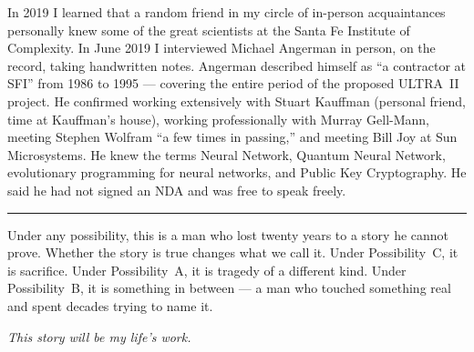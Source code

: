 In 2019 I learned that a random friend in my circle of in-person acquaintances personally knew some of the great scientists at the Santa Fe Institute of Complexity. In June 2019 I interviewed Michael Angerman in person, on the record, taking handwritten notes. Angerman described himself as ``a contractor at SFI'' from 1986 to 1995 --- covering the entire period of the proposed ULTRA~II project. He confirmed working extensively with Stuart Kauffman (personal friend, time at Kauffman's house), working professionally with Murray Gell-Mann, meeting Stephen Wolfram ``a few times in passing,'' and meeting Bill Joy at Sun Microsystems. He knew the terms Neural Network, Quantum Neural Network, evolutionary programming for neural networks, and Public Key Cryptography. He said he had not signed an NDA and was free to speak freely.

\vspace{1cm}\noindent\rule{0.5\textwidth}{0.5pt}\vspace{0.5cm}

Under any possibility, this is a man who lost twenty years to a story he cannot prove. Whether the story is true changes what we call it. Under Possibility~C, it is sacrifice. Under Possibility~A, it is tragedy of a different kind. Under Possibility~B, it is something in between --- a man who touched something real and spent decades trying to name it.

\begin{center}\textit{This story will be my life's work.}\end{center}

\chapterreturn
